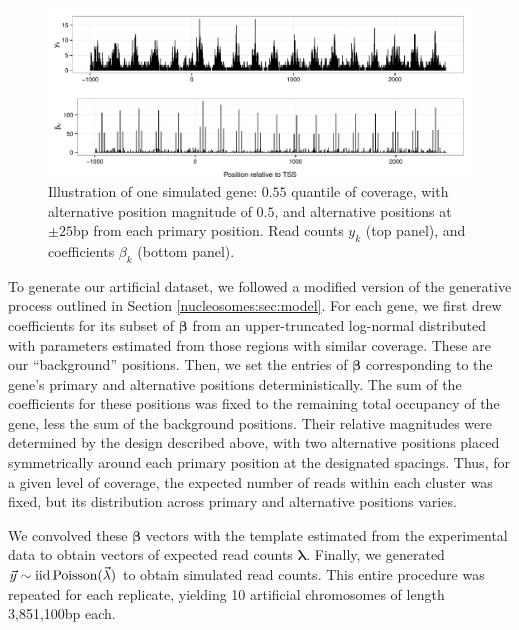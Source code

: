 \ifx\nofigures\undefined
\begin{figure}
\begin{center}
\includegraphics[width=\textwidth]{figures/nucleosomes/plot_repGene_combined}
\caption{Illustration of one simulated gene: $0.55$ quantile of coverage, with alternative position magnitude of $0.5$, and alternative positions at $\pm 25$bp from each primary position. Read counts $y_k$ (top panel), and coefficients $\beta_k$ (bottom panel). \label{nucleosomes:fig:repgene}}
\end{center}
\end{figure}
\fi

To generate our artificial dataset, we followed a modified version of the generative process outlined in Section \ref{nucleosomes:sec:model}.
For each gene, we first drew coefficients for its subset of $\bm \beta$ from an upper-truncated log-normal distributed with parameters estimated from those regions with similar coverage.
These are our ``background'' positions.
Then, we set the entries of $\bm \beta$ corresponding to the gene's primary and alternative positions deterministically.
The sum of the coefficients for these positions was fixed to the remaining total occupancy of the gene, less the sum of the background positions.
Their relative magnitudes were determined by the design described above, with two alternative positions placed symmetrically around each primary position at the designated spacings.
Thus, for a given level of coverage, the expected number of reads within each cluster was fixed, but its distribution across primary and alternative positions varies.

We convolved these $\bm \beta$ vectors with the template estimated from the experimental data to obtain vectors of expected read counts $\bm \lambda$.
Finally, we generated $\vec y \sim \mathrm{iid} \operatorname{Poisson}(\vec \lambda)$ to obtain simulated read counts.
This entire procedure was repeated for each replicate, yielding 10 artificial chromosomes of length 3,851,100bp each.

